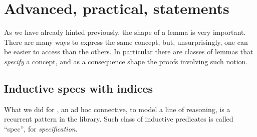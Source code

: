 









\section{Advanced, practical, statements}

As we have already hinted previously, the shape of a lemma is very important.
There are many ways to express the same concept, but, unsurprisingly,
one can be easier to access than the others.  In particular there are classes of
lemmas that \emph{specify} a concept, and as a consequence shape the proofs
involving such notion.


\subsection{Inductive specs with indices}\label{ssec:specs}
What we did for , an ad hoc connective, to model a line of reasoning, is
a recurrent pattern in the \mcbMC{} library.  Such class of inductive
predicates is called ``spec'', for \emph{specification}.

